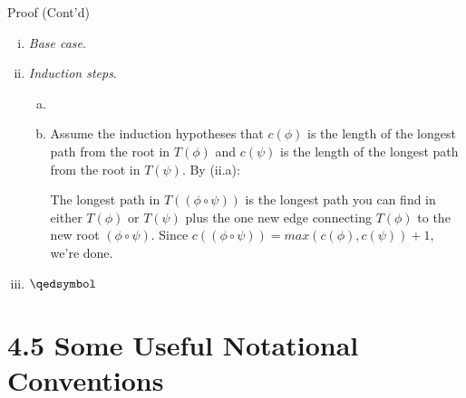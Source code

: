 \begin{frame}{Proof (Cont'd)}

\begin{enumerate}[(i)]
		
			\item \emph{Base case}. \checkmark
			
			\item \emph{Induction steps}. 
				\begin{enumerate}[(a)]

					\item \checkmark
					
					\item Assume the induction hypotheses that $c(\phi)$ is the length of the longest path from the root in $T(\phi)$ and $c(\psi)$ is the length of the longest path from the root in $T(\psi)$. By (ii.a):
					\begin{center}
\end{center}
The longest path in $T((\phi\circ\psi))$ is the longest path you can find in either $T(\phi)$ or $T(\psi)$ plus the one new edge connecting $T(\phi)$ to the new root $(\phi\circ\psi)$. Since $c((\phi\circ\psi))=max(c(\phi),c(\psi))+1$, we're done. 

		
		\end{enumerate}
		
		\item[] $\qedsymbol$
		
		\end{enumerate}
	
\end{frame}

\section{4.5 Some Useful Notational Conventions}

